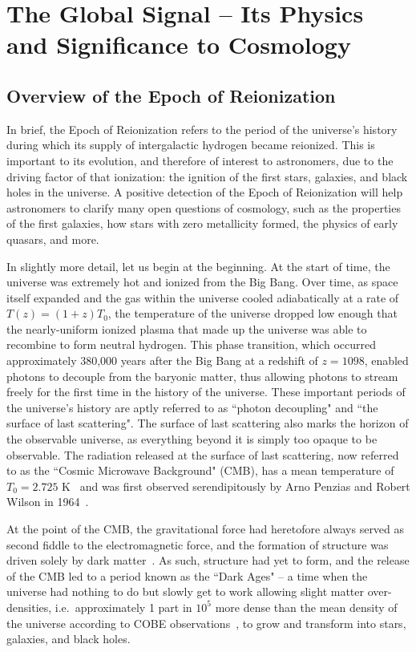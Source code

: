 \chapter{The Global Signal -- Its Physics and Significance to Cosmology}

\section{Overview of the Epoch of Reionization}
\label{sec:eor-overview}

In brief, the Epoch of Reionization refers to the period of the universe's 
history during which its supply of intergalactic hydrogen became reionized.  
This is important to its evolution, and therefore of interest to astronomers, 
due to the driving factor of that ionization: the ignition of the first stars, 
galaxies, and black holes in the universe. A positive detection of the Epoch of 
Reionization will help astronomers to clarify many open questions of cosmology, 
such as the properties of the first galaxies, how stars with zero metallicity 
formed, the physics of early quasars, and more.

In slightly more detail, let us begin at the beginning. At the start of time, 
the universe was extremely hot and ionized from the Big Bang. Over time, as 
space itself expanded and the gas within the universe cooled adiabatically
at a rate of $T(z) = (1+z)T_0$, the temperature of the universe dropped low 
enough that the nearly-uniform ionized plasma that made up the universe was 
able to recombine to form neutral hydrogen. This phase transition, which 
occurred approximately 380,000 years after the Big Bang at a redshift of $z = 
1098$, enabled photons to decouple from the baryonic matter, thus allowing 
photons to stream freely for the first time in the history of the universe.  
These important periods of the universe's history are aptly referred to as 
``photon decoupling" and ``the surface of last scattering". The surface of last 
scattering also marks the horizon of the observable universe, as everything 
beyond it is simply too opaque to be observable. The radiation released at the 
surface of last scattering, now referred to as the ``Cosmic Microwave 
Background" (CMB), has a mean temperature of $T_0 = 2.725$ K~\citep{fixsen2009} 
and was first observed serendipitously by Arno Penzias and Robert Wilson in 
1964~\citep{penzias-wilson1965}.  

At the point of the CMB, the gravitational force had heretofore always served 
as second fiddle to the electromagnetic force, and the formation of structure 
was driven solely by dark matter~\citep{zaroubi2012}.  As such, structure had 
yet to form, and the release of the CMB led to a period known as the ``Dark 
Ages" -- a time when the universe had nothing to do but slowly get to work 
allowing slight matter over-densities, i.e.~approximately 1 part in $10^5$ more 
dense than the mean density of the universe according to COBE 
observations~\citep{smoot1992}, to grow and transform into stars, galaxies, and 
black holes.

